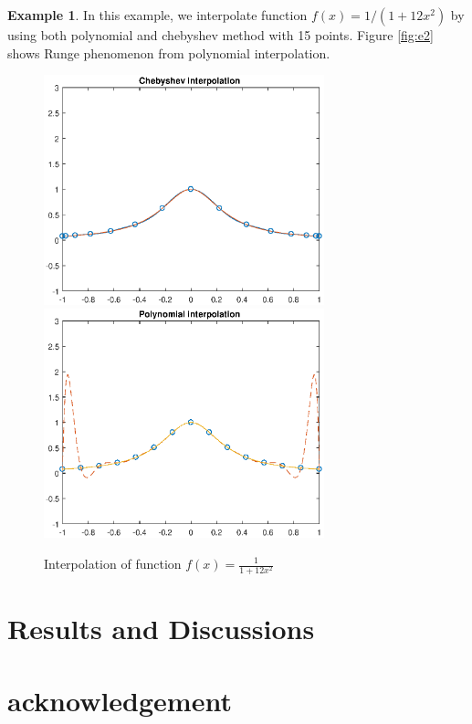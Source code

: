 \documentclass[11pt]{amsart}
\theoremstyle{definition}
\newtheorem{exmp}{Example}[section]
\begin{document}
\begin{exmp}
In this example, we interpolate function $f(x)=1/(1+12x^2)$ by using both polynomial and chebyshev method with 15 points. Figure \eqref{fig:e2} shows Runge phenomenon from polynomial interpolation.\\
\begin{figure}     	\centerline{\includegraphics[width=3.2in]{./figs/e2a.eps}
      	\hspace{-6pt}
     	\includegraphics[width=3.2in]{./figs/e2b.eps}}
     	\hspace{-6pt}
		\caption{Interpolation of function $f(x)=\frac{1}{1+12x^2}$}
        \label{fig:e2}
\end{figure}
\end{exmp}

\section{Results and Discussions}
\section{acknowledgement}
\end{document}
